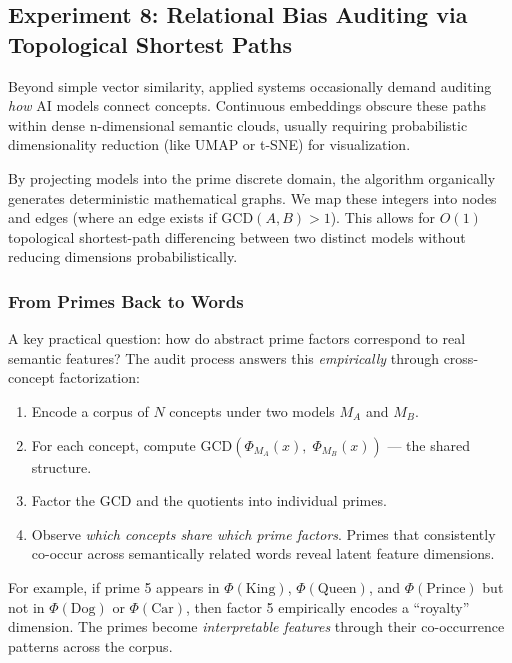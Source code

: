 \documentclass[10pt]{article}
\begin{document}
\subsection{Experiment 8: Relational Bias Auditing via Topological Shortest Paths}

Beyond simple vector similarity, applied systems occasionally demand auditing \emph{how} AI models connect concepts. Continuous embeddings obscure these paths within dense n-dimensional semantic clouds, usually requiring probabilistic dimensionality reduction (like UMAP or t-SNE) for visualization.

By projecting models into the prime discrete domain, the algorithm organically generates deterministic mathematical graphs. We map these integers into nodes and edges (where an edge exists if $\text{GCD}(A, B) > 1$). This allows for $O(1)$ topological shortest-path differencing between two distinct models without reducing dimensions probabilistically.

\subsubsection{From Primes Back to Words}

A key practical question: how do abstract prime factors correspond to real semantic features? The audit process answers this \emph{empirically} through cross-concept factorization:

\begin{enumerate}[nosep, leftmargin=*]
    \item Encode a corpus of $N$ concepts under two models $M_A$ and $M_B$.
    \item For each concept, compute $\text{GCD}(\Phi_{M_A}(x),\; \Phi_{M_B}(x))$ --- the shared structure.
    \item Factor the GCD and the quotients into individual primes.
    \item Observe \emph{which concepts share which prime factors}. Primes that consistently co-occur across semantically related words reveal latent feature dimensions.
\end{enumerate}

For example, if prime 5 appears in $\Phi(\text{King})$, $\Phi(\text{Queen})$, and $\Phi(\text{Prince})$ but not in $\Phi(\text{Dog})$ or $\Phi(\text{Car})$, then factor 5 empirically encodes a ``royalty'' dimension. The primes become \emph{interpretable features} through their co-occurrence patterns across the corpus.
\end{document}
